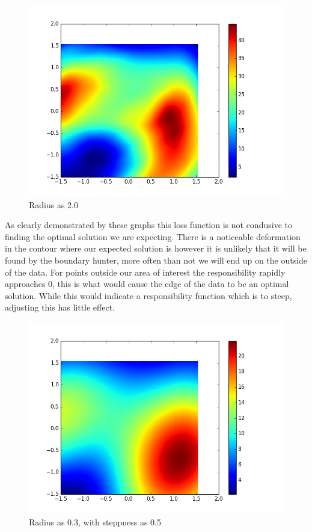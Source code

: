 \documentclass{article}
\theoremstyle{definition}
\begin{document}
\begin{figure}[H]
  \centering
  \begin{minipage}[b]{0.8\textwidth}
    \includegraphics[width=\textwidth]{LossPlot-3.png}
    \caption{Radius as 2.0}
  \end{minipage}
  \hfill
\end{figure}

As clearly demonstrated by these graphs this loss function is not condusive to finding the optimal solution we are expecting.  There is a noticeable deformation in the contour where our expected solution is however it is unlikely that it will be found by the boundary hunter, more often than not we will end up on the outside of the data. For points outside our area of interest the responsibility rapidly approaches 0, this is what would cause the edge of the data to be an optimal solution. While this would indicate a responsibility function which is to steep, adjusting this has little effect.

\begin{figure}[H]
  \centering
  \begin{minipage}[b]{0.8\textwidth}
    \includegraphics[width=\textwidth]{LossPlot-4.png}
    \caption{Radius as 0.3, with steppness as 0.5}
  \end{minipage}
  \hfill
\end{figure}
\end{document}
